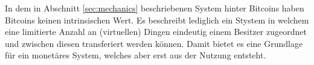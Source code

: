 In dem in Abschnitt \ref{sec:mechanics} beschriebenen System hinter Bitcoins haben Bitcoins keinen intrinsischen Wert.
Es beschreibt lediglich ein Stystem in welchem eine limitierte Anzahl an (virtuellen) Dingen eindeutig einem Besitzer zugeordnet und zwischen diesen transferiert werden können.
Damit bietet es eine Grundlage für ein monetäres System, welches aber erst aus der Nutzung entsteht.
